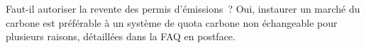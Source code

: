\documentclass[a5paper,french]{memoir}
\begin{document}
Faut-il autoriser la revente des permis d'émissions~? Oui, %
instaurer un marché du carbone est préférable à un système de quota carbone non échangeable pour plusieurs raisons, détaillées dans la FAQ en postface. 

\end{document}

